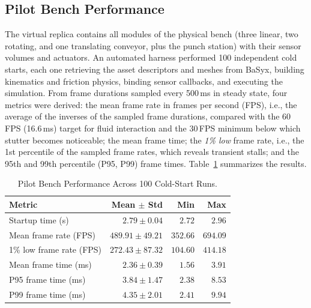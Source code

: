 \documentclass{ieeeojies}
\begin{document}
\subsection{Pilot Bench Performance}
\label{sec:res_fms_bench}

The virtual replica contains all modules of the physical bench (three linear, two rotating, and one translating conveyor, plus the punch station) with their sensor volumes and actuators. An automated harness performed 100 independent cold starts, each one retrieving the asset descriptors and meshes from BaSyx, building kinematics and friction physics, binding sensor callbacks, and executing the simulation. From frame durations sampled every 500\,ms in steady state, four metrics were derived: the mean frame rate in frames per second (FPS), i.e., the average of the inverses of the sampled frame durations, compared with the 60\,FPS (16.6\,ms) target for fluid interaction and the 30\,FPS minimum below which stutter becomes noticeable; the mean frame time; the \textit{1\% low} frame rate, i.e., the 1st percentile of the sampled frame rates, which reveals transient stalls; and the 95th and 99th percentile (P95, P99) frame times. Table~\ref{tab:fms_results} summarizes the results.

\begin{table}[t]
\centering
\caption{Pilot Bench Performance Across 100 Cold-Start Runs.}
\label{tab:fms_results}
\renewcommand{\arraystretch}{1.25}
\begin{tabular*}{\columnwidth}{@{\extracolsep{\fill}}lrrr@{}}
\toprule
\textbf{Metric} & \textbf{Mean $\pm$ Std} & \textbf{Min} & \textbf{Max} \\
\midrule
Startup time (s)        & $2.79 \pm 0.04$    & $2.72$   & $2.96$   \\
Mean frame rate (FPS)   & $489.91 \pm 49.21$ & $352.66$ & $694.09$ \\
1\% low frame rate (FPS)& $272.43 \pm 87.32$ & $104.60$ & $414.18$ \\
Mean frame time (ms)    & $2.36 \pm 0.39$    & $1.56$   & $3.91$   \\
P95 frame time (ms)     & $3.84 \pm 1.47$    & $2.38$   & $8.53$   \\
P99 frame time (ms)     & $4.35 \pm 2.01$    & $2.41$   & $9.94$   \\
\bottomrule
\end{tabular*}
\end{table}
\end{document}
